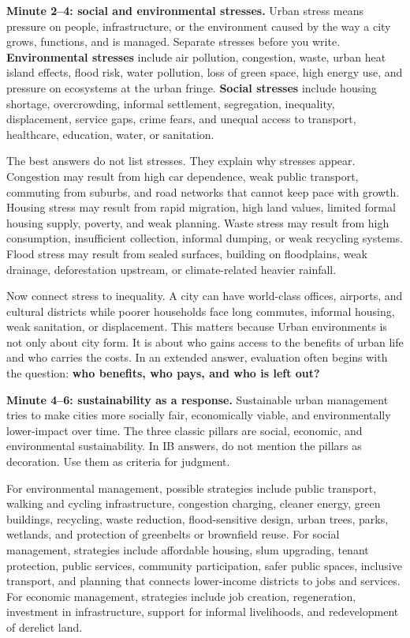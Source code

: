 \documentclass[11pt,a4paper]{article}
\newcommand{\term}[1]{\textcolor{HeadingBlue}{\textbf{#1}}}
\begin{document}
\textbf{Minute 2--4: social and environmental stresses.}
Urban stress means pressure on people, infrastructure, or the environment caused
by the way a city grows, functions, and is managed. Separate stresses before
you write. \term{Environmental stresses} include air pollution, congestion,
waste, urban heat island effects, flood risk, water pollution, loss of green
space, high energy use, and pressure on ecosystems at the urban fringe.
\term{Social stresses} include housing shortage, overcrowding, informal
settlement, segregation, inequality, displacement, service gaps, crime fears,
and unequal access to transport, healthcare, education, water, or sanitation.

The best answers do not list stresses. They explain why stresses appear.
Congestion may result from high car dependence, weak public transport, commuting
from suburbs, and road networks that cannot keep pace with growth. Housing
stress may result from rapid migration, high land values, limited formal
housing supply, poverty, and weak planning. Waste stress may result from high
consumption, insufficient collection, informal dumping, or weak recycling
systems. Flood stress may result from sealed surfaces, building on floodplains,
weak drainage, deforestation upstream, or climate-related heavier rainfall.

Now connect stress to inequality. A city can have world-class offices, airports,
and cultural districts while poorer households face long commutes, informal
housing, weak sanitation, or displacement. This matters because Urban
environments is not only about city form. It is about who gains access to the
benefits of urban life and who carries the costs. In an extended answer,
evaluation often begins with the question: \term{who benefits, who pays, and
who is left out?}

\textbf{Minute 4--6: sustainability as a response.}
Sustainable urban management tries to make cities more socially fair,
economically viable, and environmentally lower-impact over time. The three
classic pillars are social, economic, and environmental sustainability. In IB
answers, do not mention the pillars as decoration. Use them as criteria for
judgment.

For environmental management, possible strategies include public transport,
walking and cycling infrastructure, congestion charging, cleaner energy,
green buildings, recycling, waste reduction, flood-sensitive design, urban
trees, parks, wetlands, and protection of greenbelts or brownfield reuse. For
social management, strategies include affordable housing, slum upgrading,
tenant protection, public services, community participation, safer public
spaces, inclusive transport, and planning that connects lower-income districts
to jobs and services. For economic management, strategies include job creation,
regeneration, investment in infrastructure, support for informal livelihoods,
and redevelopment of derelict land.
\end{document}
